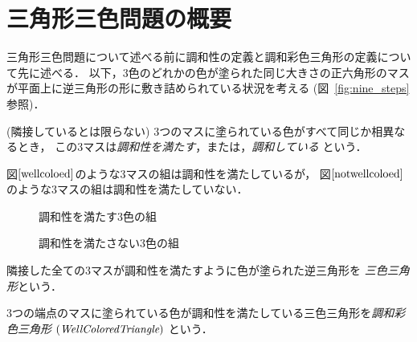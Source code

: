 \section{三角形三色問題の概要}
三角形三色問題について述べる前に調和性の定義と調和彩色三角形の定義について先に述べる．
{\color{red} 以下，$3$色のどれかの色が塗られた同じ大きさの正六角形のマスが平面上に逆三角形の形に敷き詰められている状況を考える (図~\ref{fig:nine_steps}参照)．}

\begin{dfn}[調和性] \label{dfn:wc}\rm
  (隣接しているとは限らない) $3$つのマスに塗られている色がすべて同じか相異なるとき，
  この$3$マスは{\em 調和性を満たす}，または，{\em 調和している} という．
\end{dfn}

\begin{exm}
  図$\ref{wellcoloed}$のような$3$マスの組は調和性を満たしているが，
  図$\ref{notwellcoloed}$のような$3$マスの組は調和性を満たしていない．
  \begin{figure}[h]
    \centering
    
    \caption{調和性を満たす$3$色の組}
    \label{wellcoloed}
  \end{figure}
  \begin{figure}[h]
    \centering
    
    \caption{調和性を満たさない$3$色の組}
    \label{notwellcoloed}
  \end{figure}
\end{exm}

\begin{dfn}[三色三角形] \label{dfn:three_tri}\rm
  隣接した全ての$3$マスが調和性を満たすように色が塗られた逆三角形を
  {\em 三色三角形}という．
\end{dfn}

\begin{dfn}[調和彩色三角形] \label{dfn:wc_tri}\rm
  $3$つの端点のマスに塗られている色が調和性を満たしている三色三角形を{\em 調和彩色三角形} $(\textit{WellColoredTriangle})$ という．
\end{dfn}

